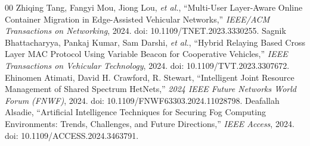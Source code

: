 \documentclass[journal]{IEEEtran}
\begin{document}
\begin{thebibliography}{00}
 Zhiqing Tang, Fangyi Mou, Jiong Lou, \emph{et al.}, ``Multi-User Layer-Aware Online Container Migration in Edge-Assisted Vehicular Networks,'' \emph{IEEE/ACM Transactions on Networking}, 2024. doi: 10.1109/TNET.2023.3330255.
 Sagnik Bhattacharyya, Pankaj Kumar, Sam Darshi, \emph{et al.}, ``Hybrid Relaying Based Cross Layer MAC Protocol Using Variable Beacon for Cooperative Vehicles,'' \emph{IEEE Transactions on Vehicular Technology}, 2024. doi: 10.1109/TVT.2023.3307672.
 Ehinomen Atimati, David H. Crawford, R. Stewart, ``Intelligent Joint Resource Management of Shared Spectrum HetNets,'' \emph{2024 IEEE Future Networks World Forum (FNWF)}, 2024. doi: 10.1109/FNWF63303.2024.11028798.
 Deafallah Alsadie, ``Artificial Intelligence Techniques for Securing Fog Computing Environments: Trends, Challenges, and Future Directions,'' \emph{IEEE Access}, 2024. doi: 10.1109/ACCESS.2024.3463791.

\end{thebibliography}
\end{document}
